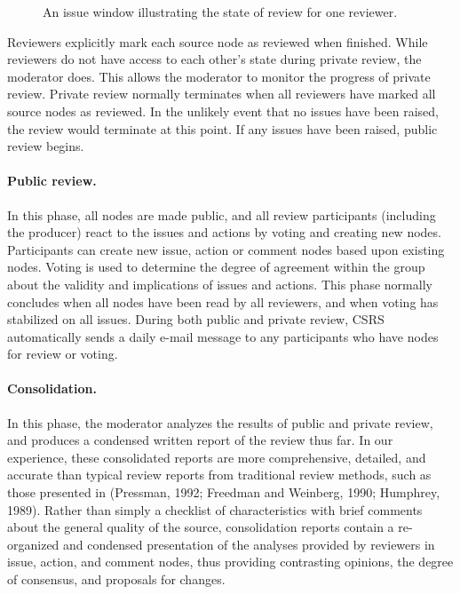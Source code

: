 \begin{figure}                                        
 {\centerline{}}
\caption{An issue window illustrating the state of review for one reviewer.}  
\label{fig:issue}
\end{figure}

Reviewers explicitly mark each source node as reviewed when finished. While
reviewers do not have access to each other's state during private review,
the moderator does.  This allows the moderator to monitor the progress of
private review.  Private review normally terminates when all reviewers have
marked all source nodes as reviewed. In the unlikely event that no issues
have been raised, the review would terminate at this point.  If any issues
have been raised, public review begins.

\paragraph{Public review.} In this phase, all nodes are made public, and all review
participants (including the producer) react to the issues and actions by
voting and creating new nodes.  Participants can create new issue, action
or comment nodes based upon existing nodes.  Voting is used to determine
the degree of agreement within the group about the validity and
implications of issues and actions.  This phase normally concludes when all
nodes have been read by all reviewers, and when voting has stabilized on
all issues.  During both public and private review, CSRS automatically
sends a daily e-mail message to any participants who have nodes for review
or voting.


\paragraph{Consolidation.} In this phase, the moderator analyzes the results of
public and private review, and produces a condensed written report of the
review thus far.  In our experience, these consolidated reports are more
comprehensive, detailed, and accurate than typical review reports from
traditional review methods, such as those presented in (Pressman, 1992;
Freedman and Weinberg, 1990; Humphrey, 1989).  Rather than simply a
checklist of characteristics with brief comments about the general quality
of the source, consolidation reports contain a re-organized and condensed
presentation of the analyses provided by reviewers in issue, action, and
comment nodes, thus providing contrasting opinions, the degree of
consensus, and proposals for changes.

